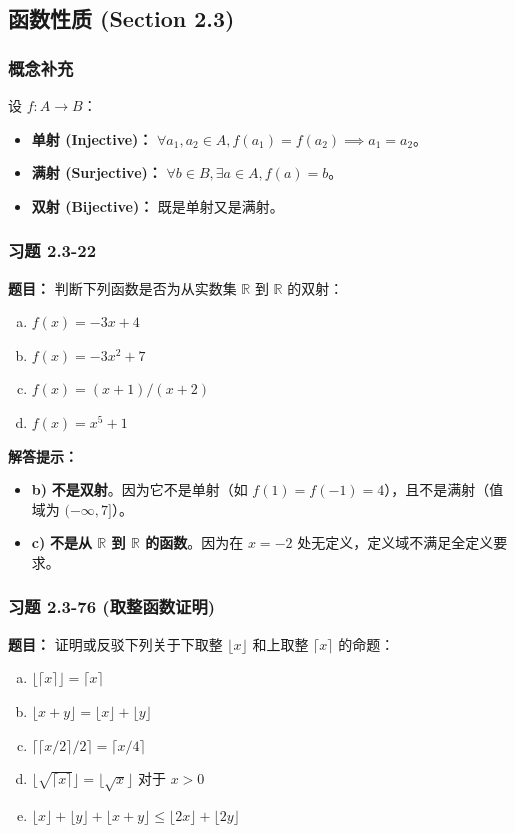 \documentclass[11pt,UTF8]{article}
\begin{document}
\subsection{函数性质 (Section 2.3)}

\subsubsection*{概念补充}
设 $f: A \to B$：
\begin{itemize}
    \item \textbf{单射 (Injective)：} $\forall a_1, a_2 \in A, f(a_1) = f(a_2) \implies a_1 = a_2$。
    \item \textbf{满射 (Surjective)：} $\forall b \in B, \exists a \in A, f(a) = b$。
    \item \textbf{双射 (Bijective)：} 既是单射又是满射。
\end{itemize}

\subsubsection*{习题 2.3-22}
\textbf{题目：} 判断下列函数是否为从实数集 $\mathbb{R}$ 到 $\mathbb{R}$ 的双射：
\begin{enumerate}[a)]
    \item $f(x) = -3x + 4$
    \item $f(x) = -3x^2 + 7$
    \item $f(x) = (x + 1)/(x + 2)$
    \item $f(x) = x^5 + 1$
\end{enumerate}

\textbf{解答提示：}
\begin{itemize}
    \item \textbf{b)} \textbf{不是双射}。因为它不是单射（如 $f(1) = f(-1) = 4$），且不是满射（值域为 $(-\infty, 7]$）。
    \item \textbf{c)} \textbf{不是从 $\mathbb{R}$ 到 $\mathbb{R}$ 的函数}。因为在 $x = -2$ 处无定义，定义域不满足全定义要求。
\end{itemize}

\subsubsection*{习题 2.3-76 (取整函数证明)}
\textbf{题目：} 证明或反驳下列关于下取整 $\lfloor x \rfloor$ 和上取整 $\lceil x \rceil$ 的命题：
\begin{enumerate}[a)]
    \item $\lfloor \lceil x \rceil \rfloor = \lceil x \rceil$
    \item $\lfloor x + y \rfloor = \lfloor x \rfloor + \lfloor y \rfloor$
    \item $\lceil \lceil x/2 \rceil / 2 \rceil = \lceil x/4 \rceil$
    \item $\lfloor \sqrt{\lceil x \rceil} \rfloor = \lfloor \sqrt{x} \rfloor$ 对于 $x > 0$
    \item $\lfloor x \rfloor + \lfloor y \rfloor + \lfloor x + y \rfloor \le \lfloor 2x \rfloor + \lfloor 2y \rfloor$
\end{enumerate}
\end{document}
